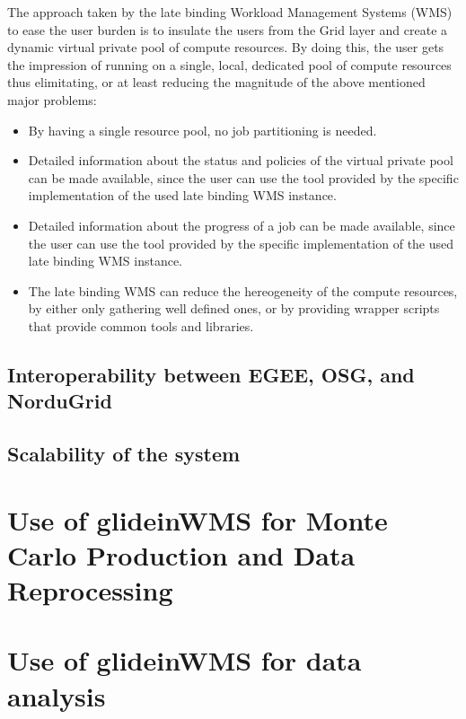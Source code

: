 \documentclass[a4paper]{jpconf}
\begin{document}
The approach taken by the late binding Workload Management Systems (WMS) to ease the user burden is to insulate the 
users from the Grid layer and create a dynamic virtual private pool of compute resources.
By doing this, the user gets the impression of running on a single, local, dedicated pool of compute resources
thus elimitating, or at least reducing the magnitude of the above mentioned major problems:
\begin {itemize}
\item 
By having a single resource pool, no job partitioning is needed.
\item
Detailed information about the status and policies of the virtual private pool can be made available, 
since the user can use the tool provided by the specific implementation of the used late binding WMS instance.
\item 
Detailed information about the progress of a job can be made available,
since the user can use the tool provided by the specific implementation of the used late binding WMS instance.
\item
The late binding WMS can reduce the hereogeneity of the compute resources, by either only gathering well defined ones,
or by providing wrapper scripts that provide common tools and libraries.
\end{itemize}


\subsection {Interoperability between EGEE, OSG, and NorduGrid}



\subsection {Scalability of the system}



\section{Use of glideinWMS for Monte Carlo Production and Data Reprocessing }



\section{Use of glideinWMS for data analysis}
\end{document}
